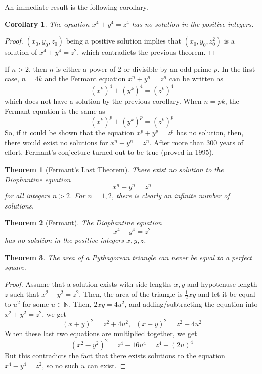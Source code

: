 \documentclass{article}
\newtheorem{theorem}{Theorem}[section]
\newtheorem{corollary}{Corollary}[theorem]
\theoremstyle{remark}
\theoremstyle{definition}
\begin{document}
An immediate result is the following corollary. 

\begin{corollary}
The equation $x^4 + y^4 = z^4$ has no solution in the positive integers.
\end{corollary}
\begin{proof}
$(x_0, y_0, z_0)$ being a positive solution implies that $(x_0, y_0, z_0^2)$ is a solution of $x^4 + y^4 = z^2$, which contradicts the previous theorem. 
\end{proof}

If $n>2$, then $n$ is either a power of $2$ or divisible by an odd prime $p$. In the first case, $n=4k$ and the Fermant equation $x^n + y^n = z^n$ can be written as 
\[(x^k)^4 + (y^k)^4 = (z^k)^4\]
which does not have a solution by the previous corollary. When $n=pk$, the Fermant equation is the same as 
\[(x^k)^p + (y^k)^p = (z^k)^p\]
So, if it could be shown that the equation $x^p + y^p = z^p$ has no solution, then, there would exist no solutions for $x^n + y^n = z^n$. After more than 300 years of effort, Fermant's conjecture turned out to be true (proved in 1995). 

\begin{theorem}[Fermant's Last Theorem]
There exist no solution to the Diophantine equation 
\[x^n + y^n = z^n\]
for all integers $n>2$. For $n=1, 2$, there is clearly an infinite number of solutions. 
\end{theorem}

\begin{theorem}[Fermant]
The Diophantine equation
\[x^4 - y^4 = z^2\]
has no solution in the positive integers $x, y, z$. 
\end{theorem}

\begin{theorem}
The area of a Pythagorean triangle can never be equal to a perfect square. 
\end{theorem}
\begin{proof}
Assume that a solution exists with side lengths $x, y$ and hypotenuse length $z$ such that $x^2 + y^2 = z^2$. Then, the area of the triangle is $\frac{1}{2} xy$ and let it be equal to $u^2$ for some $u \in \mathbb{N}$. Then, $2xy = 4u^2$, and adding/subtracting the equation into $x^2 + y^2 = z^2$, we get
\[(x+y)^2 = z^2 + 4u^2, \;\; (x-y)^2 = z^2 - 4u^2\]
When these last two equations are multiplied together, we get
\[(x^2-y^2)^2 = z^4 - 16u^4 = z^4 - (2u)^4\]
But this contradicts the fact that there exists solutions to the equation $x^4 - y^4 = z^2$, so no such $u$ can exist. 
\end{proof}
\end{document}
